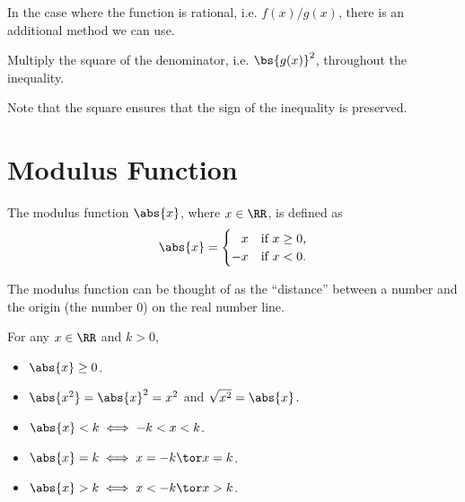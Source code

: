 In the case where the function is rational, i.e. $f(x)/g(x)$, there is an additional method we can use.
\begin{recipe}
    Multiply the square of the denominator, i.e. $\bs{g(x)}^2$, throughout the inequality.
\end{recipe}
Note that the square ensures that the sign of the inequality is preserved.

\section{Modulus Function}

\begin{definition}
    The modulus function $\abs{x}$, where $x \in \RR$, is defined as \[\abs{x} = \begin{cases}
        \phantom{-}x & \text{if $x \geq 0$,}\\
        -x & \text{if $x < 0$.}
    \end{cases}\]
\end{definition}

The modulus function can be thought of as the ``distance'' between a number and the origin (the number 0) on the real number line.

\begin{fact}
    For any $x \in \RR$ and $k > 0$,
    \begin{itemize}
        \item $\abs{x} \geq 0$.
        \item $\abs{x^2} = \abs{x}^2 = x^2$ and $\sqrt{x^2} = \abs{x}$.
        \item $\abs{x} < k \iff -k < x < k$.
        \item $\abs{x} = k \iff x = -k \tor x = k$.
        \item $\abs{x} > k \iff x < -k \tor x > k$.
    \end{itemize}
\end{fact}